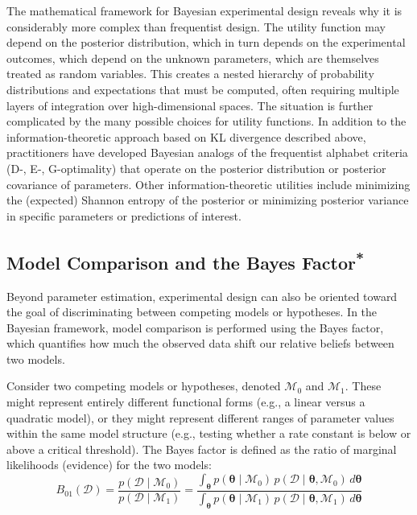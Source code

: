 The mathematical framework for Bayesian experimental design reveals why it is considerably more complex than frequentist design. The utility function may depend on the posterior distribution, which in turn depends on the experimental outcomes, which depend on the unknown parameters, which are themselves treated as random variables. This creates a nested hierarchy of probability distributions and expectations that must be computed, often requiring multiple layers of integration over high-dimensional spaces. The situation is further complicated by the many possible choices for utility functions. In addition to the information-theoretic approach based on KL divergence described above, practitioners have developed Bayesian analogs of the frequentist alphabet criteria (D-, E-, G-optimality) that operate on the posterior distribution or posterior covariance of parameters. Other information-theoretic utilities include minimizing the (expected) Shannon entropy of the posterior or minimizing posterior variance in specific parameters or predictions of interest.

\subsection{\texorpdfstring{Model Comparison and the Bayes Factor\textsuperscript{*}}{Model Comparison and the Bayes Factor}}

Beyond parameter estimation, experimental design can also be oriented toward the goal of discriminating between competing models or hypotheses. In the Bayesian framework, model comparison is performed using the Bayes factor, which quantifies how much the observed data shift our relative beliefs between two models.

Consider two competing models or hypotheses, denoted $\mathcal{M}_0$ and $\mathcal{M}_1$. These might represent entirely different functional forms (e.g., a linear versus a quadratic model), or they might represent different ranges of parameter values within the same model structure (e.g., testing whether a rate constant is below or above a critical threshold). The Bayes factor is defined as the ratio of marginal likelihoods (evidence) for the two models:
\begin{equation}
    B_{01}(\mathcal{D}) = \frac{p(\mathcal{D}\mid\mathcal{M}_0)}{p(\mathcal{D}\mid\mathcal{M}_1)}
    =
    \frac{\int_{\boldsymbol{\theta}} p(\boldsymbol{\theta}\mid\mathcal{M}_0)\, p(\mathcal{D}\mid\boldsymbol{\theta}, \mathcal{M}_0)\, d\boldsymbol{\theta}}
         {\int_{\boldsymbol{\theta}} p(\boldsymbol{\theta}\mid\mathcal{M}_1)\, p(\mathcal{D}\mid\boldsymbol{\theta}, \mathcal{M}_1)\, d\boldsymbol{\theta}}
\end{equation}

